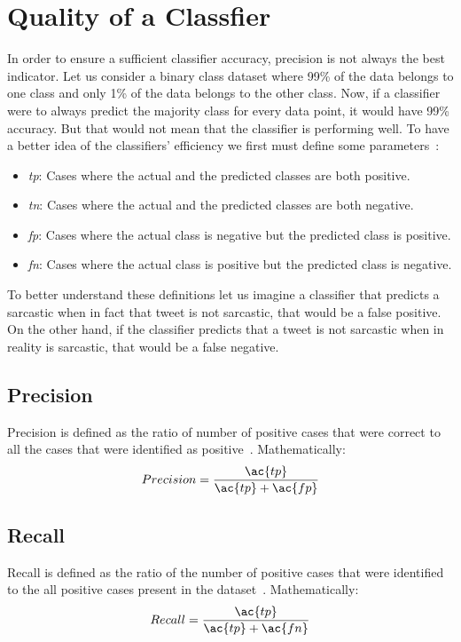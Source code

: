 \section{Quality of a Classfier}
\label{sec:score}
In order to ensure a sufficient classifier accuracy, precision is not always the best indicator. Let us consider a binary class dataset where 99\% of the data belongs to one class and only 1\% of the data belongs to the other class. Now, if a classifier were to always predict the majority class for every data point, it would have 99\% accuracy. But that would not mean that the classifier is performing well. To have a better idea of the classifiers' efficiency we first must define some parameters~\cite{f1score}:
\begin{itemize}
	\item \textit{\acf{tp}}: Cases where the actual and the predicted classes are both positive.
	\item \textit{\acf{tn}}: Cases where the actual and the predicted classes are both negative.
	\item \textit{\acf{fp}}: Cases where the actual class is negative but the predicted class is positive.
	\item \textit{\acf{fn}}: Cases where the actual class is positive but the predicted class is negative.
\end{itemize}
To better understand these definitions let us imagine a classifier that predicts a sarcastic when in fact that tweet is not sarcastic, that would be a false positive. On the other hand, if the classifier predicts that a tweet is not sarcastic when in reality is sarcastic, that would be a false negative.
\subsection{Precision}
Precision is defined as the ratio of number of positive cases that were correct to all the cases that were identified as positive~\cite{f1score}. Mathematically:
\begin{equation}
	Precision = \frac{\ac{tp}}{\ac{tp}+\ac{fp}}
	\label{ec:precision}
\end{equation}
\subsection{Recall}
Recall is defined as the ratio of the number of positive cases that were identified to the all positive cases present in the dataset~\cite{f1score}. Mathematically:
\begin{equation}
	Recall = \frac{\ac{tp}}{\ac{tp}+\ac{fn}}
	\label{ec:recall}
\end{equation}
